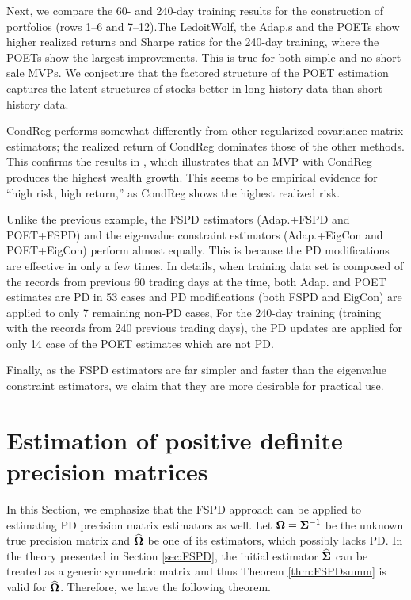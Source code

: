 \documentclass[times,sort&compress,3p]{elsarticle}
\begin{document}
Next, we compare the 60- and 240-day training results for the construction of portfolios (rows 1--6 and
7--12).The LedoitWolf, the Adap.s and the POETs show higher realized returns and
Sharpe ratios for the 240-day training, where the POETs show the largest improvements. This is true for both simple and no-short-sale MVPs. We conjecture that the
factored structure of the POET estimation captures the latent structures of stocks better in long-history data than
 short-history data.


CondReg performs somewhat differently from other regularized covariance matrix estimators; the realized return of CondReg
dominates those of the other methods. This confirms the results in \citet{Won2013}, which illustrates that an MVP with
 CondReg produces the highest wealth growth. This seems to be empirical evidence for ``high risk, high return,'' as CondReg
 shows the highest realized risk.
 
Unlike the previous example, the FSPD estimators (Adap.+FSPD and
 POET+FSPD) and the eigenvalue constraint estimators (Adap.+EigCon and POET+EigCon)
 perform almost equally.
This is because the PD modifications are effective in only a few times. In details, when training data set 
is composed of the records from previous 60 trading days at the time,  
both Adap. and POET estimates are PD in 53 cases 
and PD modifications (both FSPD and EigCon) are applied to only 7 remaining non-PD cases, For the 240-day training (training with
the records from 240 previous trading days), the PD updates are applied for only 14 case of the POET estimates which are not PD. 


Finally, as the FSPD estimators are far simpler and faster than the eigenvalue constraint
estimators, we claim that they are more desirable for practical use.


\section{Estimation of positive definite precision matrices}\label{sec:prec}


In this Section, we emphasize that the FSPD approach can be applied to estimating PD precision
matrix estimators as well. Let ${\bf \Omega} = {\bf \Sigma}^{-1}$ be the unknown true precision matrix and
$\widehat{\bf \Omega}$ be one of its estimators, which possibly lacks PD. In the theory presented in Section
 \ref{sec:FSPD}, the initial estimator $\widehat{\bf \Sigma}$ can be treated as a generic symmetric matrix and
 thus Theorem \ref{thm:FSPDsumm} is valid for $\widehat{\bf \Omega}$. Therefore, we have the following theorem.
\end{document}
